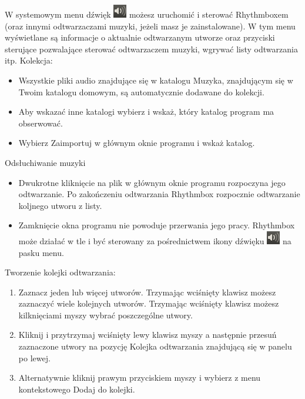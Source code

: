 W systemowym menu dźwięk \includegraphics{images/ikony_dzwiek.png} możesz uruchomić i sterować Rhythmboxem (oraz innymi odtwarzaczami muzyki, jeżeli masz je zainstalowane). W tym menu wyświetlane są informacje o aktualnie odtwarzanym utworze oraz przyciski sterujące pozwalające sterować odtwarzaczem muzyki, wgrywać listy odtwarzania itp.
Kolekcja:
\begin{itemize}
\item Wszystkie pliki audio znajdujące się w katalogu Muzyka, znajdującym się w Twoim katalogu domowym, są automatycznie dodawane do kolekcji.
\item Aby wskazać inne katalogi wybierz  i wskaż, który katalog program ma obserwować.
\item Wybierz \textcolor{ubuntu_orange}{Zaimportuj} w głównym oknie programu i wskaż katalog.
\end{itemize}
Odsłuchiwanie muzyki
\begin{itemize}
\item Dwukrotne kliknięcie na plik w głównym oknie programu rozpoczyna jego odtwarzanie. Po zakończeniu odtwarzania Rhythmbox rozpocznie odtwarzanie koljnego utworu z listy.
\item Zamknięcie okna programu nie powoduje przerwania jego pracy. Rhythmbox może działać w tle i być sterowany za pośrednictwem ikony dźwięku \includegraphics{images/ikony_dzwiek.png} na pasku menu.
\end{itemize}
Tworzenie kolejki odtwarzania:
\begin{enumerate}
\item Zaznacz jeden lub więcej utworów. Trzymając wciśnięty klawisz  możesz zaznaczyć wiele kolejnych utworów. Trzymając wciśnięty klawisz  możesz kilknięciami myszy wybrać poszczególne utwory.
\item Kliknij i przytrzymaj wciśnięty lewy klawisz myszy a następnie przesuń zaznaczone utwory na pozycję \textcolor{ubuntu_orange}{Kolejka odtwarzania} znajdującą się w panelu po lewej.
\item Alternatywnie kliknij prawym przyciskiem myszy i wybierz z menu kontekstowego \textcolor{ubuntu_orange}{Dodaj do kolejki}.
\end{enumerate}
